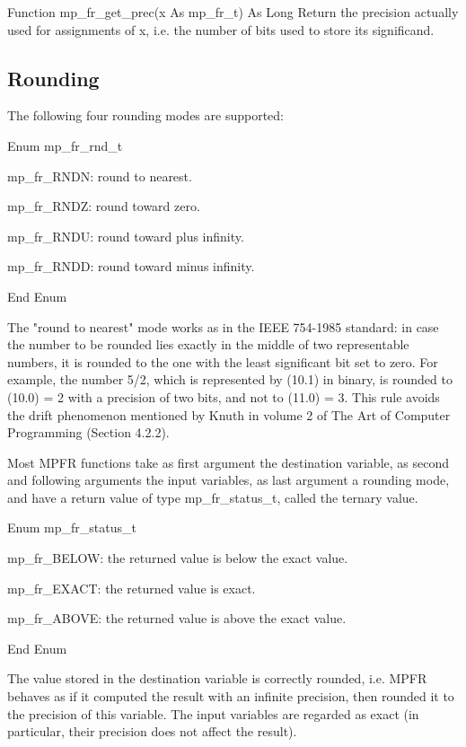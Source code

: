 \vspace{0.3cm}
Function mp\_fr\_get\_prec(x As mp\_fr\_t) As Long 
Return the precision actually used for assignments of x, i.e. the number of bits used to store its significand. 


\subsection{Rounding}
The following four rounding modes are supported: 

\vspace{0.3cm}
Enum mp\_fr\_rnd\_t 

mp\_fr\_RNDN: round to nearest. 

mp\_fr\_RNDZ: round toward zero. 

mp\_fr\_RNDU: round toward plus infinity. 

mp\_fr\_RNDD: round toward minus infinity. 

End Enum

\vspace{0.3cm}
The "round to nearest" mode works as in the IEEE 754-1985 standard: in case the number to be rounded lies exactly in the middle of two representable numbers, it is rounded to the one with the least significant bit set to zero. For example, the number 5/2, which is represented by (10.1) in binary, is rounded to (10.0) = 2 with a precision of two bits, and not to (11.0) = 3. This rule avoids the drift phenomenon mentioned by Knuth in volume 2 of The Art of Computer Programming (Section 4.2.2). 

\vspace{0.3cm}
Most MPFR functions take as first argument the destination variable, as second and following arguments the input variables, as last argument a rounding mode, and have a return value of type mp\_fr\_status\_t, called the ternary value.

\vspace{0.3cm}
Enum mp\_fr\_status\_t 

mp\_fr\_BELOW: the returned value is below the exact value. 

mp\_fr\_EXACT: the returned value is exact. 

mp\_fr\_ABOVE: the returned value is above the exact value. 

End Enum

\vspace{0.3cm}
The value stored in the destination variable is correctly rounded, i.e. MPFR behaves as if it computed the result with an infinite precision, then rounded it to the precision of this variable. The input variables are regarded as exact (in particular, their precision does not affect the result). 

